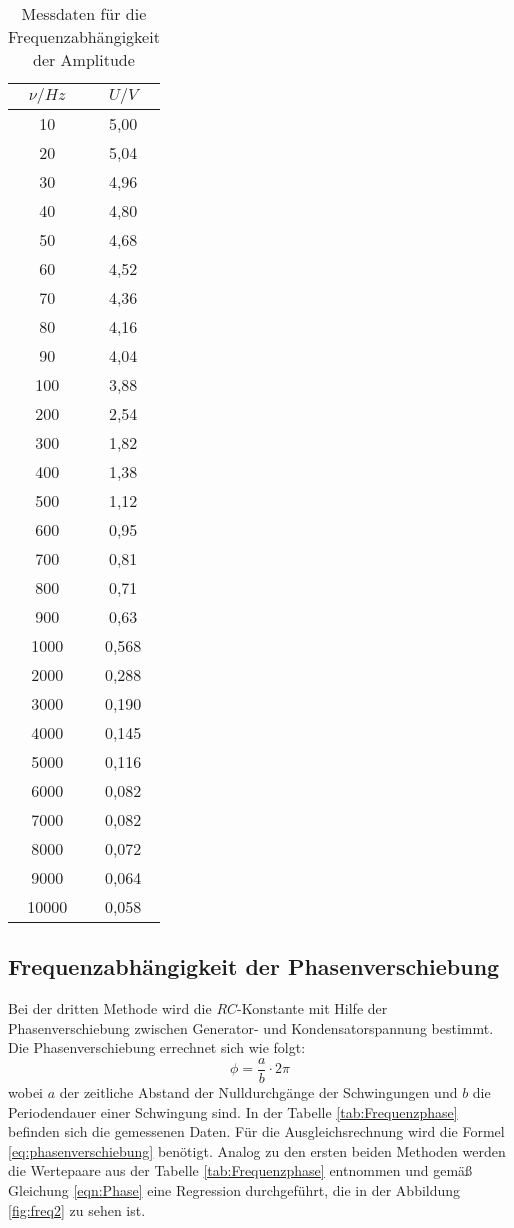 \begin{table}[htbp]
	\centering
	\caption{Messdaten für die Frequenzabhängigkeit der Amplitude}
	\label{tab:Frequenzamplitude}
	\begin{tabular}{c c}
		\toprule
		$\nu / \si{Hz} $ & $ U / \si{V}$ \\
		\midrule
		10	& 5,00 \\
		20	& 5,04 \\
		30	& 4,96 \\
		40	& 4,80 \\
		50	& 4,68 \\
		60	& 4,52 \\
		70	& 4,36 \\ 
		80	& 4,16 \\
		90	& 4,04 \\
		100	& 3,88 \\
		200	& 2,54 \\
		300	& 1,82 \\
		400	& 1,38 \\
		500	& 1,12 \\
		600	& 0,95 \\
		700	& 0,81 \\
		800	& 0,71 \\
		900	& 0,63 \\
		1000 &	0,568 \\
		2000 &	0,288 \\
		3000 &	0,190 \\
		4000 &	0,145 \\
		5000 &	0,116 \\
		6000 &	0,082 \\
		7000 &	0,082 \\
		8000 &	0,072 \\
		9000 &	0,064 \\
		10000 &	0,058 \\
		\bottomrule
	\end{tabular}
\end{table}
\FloatBarrier
\subsection{Frequenzabhängigkeit der Phasenverschiebung}
Bei der dritten Methode wird die $RC$-Konstante mit Hilfe der Phasenverschiebung zwischen Generator- und Kondensatorspannung bestimmt. Die Phasenverschiebung errechnet sich wie folgt:
\begin{equation}
\phi = \frac{a}{b} \cdot 2\pi
\end{equation}
wobei $a$ der zeitliche Abstand der Nulldurchgänge der Schwingungen und $b$ die Periodendauer einer Schwingung sind.
In der Tabelle \ref{tab:Frequenzphase} befinden sich die gemessenen Daten. Für die Ausgleichsrechnung wird die Formel \ref{eq:phasenverschiebung} benötigt.
Analog zu den ersten beiden Methoden werden die Wertepaare aus der Tabelle \ref{tab:Frequenzphase} entnommen und gemäß Gleichung \ref{eqn:Phase} eine Regression durchgeführt, die in der Abbildung \ref{fig:freq2} zu sehen ist.

